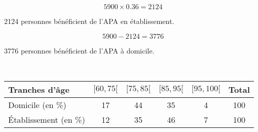 \documentclass[a4paper,11pt]{exam}
\begin{document}
\begin{questions}
	
	\question 
	\begin{equation*}
		\num{5900} \times\num{0.36} = \num{2124}
	\end{equation*}
	
	\num{2124} personnes bénéficient de l'APA en établissement.
	
	\begin{equation*}
		\num{5900} - \num{2124} = \num{3776}
	\end{equation*}
	
	\num{3776} personnes bénéficient de l'APA à domicile.
	
	\question \ \\
	\begin{tabular}{|@{\ }l@{\ }|@{\ }c@{\ }|@{\ }c@{\ }|@{\ }c@{\ }|@{\ }c@{\ }|@{\ }c@{\ }|}
		\hline
		Tranches d'âge          & $[60 , 75[$ & $[75, 85[$ & $[85, 95[$ & $[95, 100[$ & Total \\ \hline
		Domicile (en \%)        & 17         & 44         & 35         & 4           & 100   \\ \hline
		\'Etablissement (en \%) & 12         & 35         & 46         & 7           & 100   \\ \hline
	\end{tabular}
	
	\question 
\end{questions}
\end{document}
